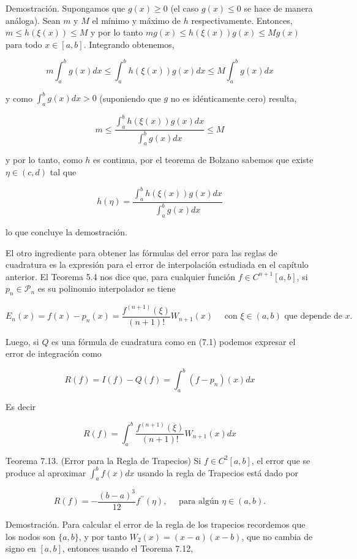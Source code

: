 \documentclass[10pt]{book}
\begin{document}
Demostración. Supongamos que $g(x) \geq 0$ (el caso $g(x) \leq 0$ se hace de manera análoga). Sean $m$ y $M$ el mínimo y máximo de $h$ respectivamente. Entonces, $m \leq h(\xi(x)) \leq M$ y por lo tanto $m g(x) \leq h(\xi(x)) g(x) \leq M g(x)$ para todo $x \in[a, b]$. Integrando obtenemos,

$$
m \int_{a}^{b} g(x) d x \leq \int_{a}^{b} h(\xi(x)) g(x) d x \leq M \int_{a}^{b} g(x) d x
$$

y como $\int_{a}^{b} g(x) d x>0$ (suponiendo que $g$ no es idénticamente cero) resulta,

$$
m \leq \frac{\int_{a}^{b} h(\xi(x)) g(x) d x}{\int_{a}^{b} g(x) d x} \leq M
$$

y por lo tanto, como $h$ es continua, por el teorema de Bolzano sabemos que existe $\eta \in(c, d)$ tal que

$$
h(\eta)=\frac{\int_{a}^{b} h(\xi(x)) g(x) d x}{\int_{a}^{b} g(x) d x}
$$

lo que concluye la demostración.

El otro ingrediente para obtener las fórmulas del error para las reglas de cuadratura es la expresión para el error de interpolación estudiada en el capítulo anterior. El Teorema 5.4 nos dice que, para cualquier función $f \in C^{n+1}[a, b]$, si $p_{n} \in \mathcal{P}_{n}$ es su polinomio interpolador se tiene

$$
E_{n}(x)=f(x)-p_{n}(x)=\frac{f^{(n+1)}(\xi)}{(n+1)!} W_{n+1}(x) \quad \text { con } \xi \in(a, b) \text { que depende de } x .
$$

Luego, si $Q$ es una fórmula de cuadratura como en (7.1) podemos expresar el error de integración como

$$
R(f)=I(f)-Q(f)=\int_{a}^{b}\left(f-p_{n}\right)(x) d x
$$

Es decir

$$
R(f)=\int_{a}^{b} \frac{f^{(n+1)}(\xi)}{(n+1)!} W_{n+1}(x) d x
$$

Teorema 7.13. (Error para la Regla de Trapecios) Si $f \in C^{2}[a, b]$, el error que se produce al aproximar $\int_{a}^{b} f(x) d x$ usando la regla de Trapecios está dado por


\begin{equation*}
R(f)=-\frac{(b-a)^{3}}{12} f^{\prime \prime}(\eta), \quad \text { para algún } \eta \in(a, b) . \tag{7.7}
\end{equation*}


Demostración. Para calcular el error de la regla de los trapecios recordemos que los nodos son $\{a, b\}$, y por tanto $W_{2}(x)=(x-a)(x-b)$, que no cambia de signo en $[a, b]$, entonces usando el Teorema 7.12,
\end{document}
